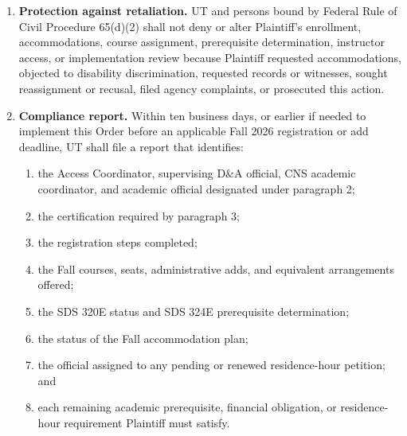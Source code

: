 \documentclass[12pt]{article}
\begin{document}
\begin{enumerate}
Personnel excluded under paragraph 1 shall communicate with Plaintiff about his accommodations, enrollment, course assignments, prerequisite determination, or course participation only through litigation counsel, formal discovery, testimony, evidence-preservation requests, or the designated coordinator.

\item \textbf{Protection against retaliation.} UT and persons bound by Federal Rule of Civil Procedure 65(d)(2) shall not deny or alter Plaintiff's enrollment, accommodations, course assignment, prerequisite determination, instructor access, or implementation review because Plaintiff requested accommodations, objected to disability discrimination, requested records or witnesses, sought reassignment or recusal, filed agency complaints, or prosecuted this action.

\item \textbf{Compliance report.} Within ten business days, or earlier if needed to implement this Order before an applicable Fall 2026 registration or add deadline, UT shall file a report that identifies:

  \begin{enumerate}[label=(\alph*),leftmargin=0.45in]
  \item the Access Coordinator, supervising D\&A official, CNS academic coordinator, and academic official designated under paragraph 2;

  \item the certification required by paragraph 3;

  \item the registration steps completed;

  \item the Fall courses, seats, administrative adds, and equivalent arrangements offered;

  \item the SDS 320E status and SDS 324E prerequisite determination;

  \item the status of the Fall accommodation plan;

  \item the official assigned to any pending or renewed residence-hour petition; and

  \item each remaining academic prerequisite, financial obligation, or residence-hour requirement Plaintiff must satisfy.
  \end{enumerate}


\end{enumerate}
\end{document}
